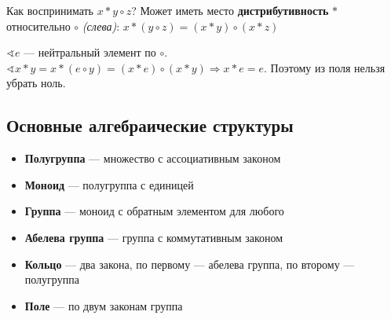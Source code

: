 Как воспринимать \(x * y \circ z\)? Может иметь место \textbf{дистрибутивность} \(*\) относительно \(\circ\) \textit{(слева)}: \(x * (y \circ z) = (x * y) \circ (x * z)\)

\(\sphericalangle e\) --- нейтральный элемент по \(\circ\). \(\sphericalangle x * y = x * (e \circ y) = (x * e) \circ (x * y) \Rightarrow x * e = e\). Поэтому из поля нельзя убрать ноль.

\subsection{Основные алгебраические структуры}

\begin{itemize}
    \item \textbf{Полугруппа} --- множество с ассоциативным законом
    \item \textbf{Моноид} --- полугруппа с единицей
    \item \textbf{Группа} --- моноид с обратным элементом для любого
    \item \textbf{Абелева группа} --- группа с коммутативным законом
    \item \textbf{Кольцо} --- два закона, по первому --- абелева группа, по второму --- полугруппа
    \item \textbf{Поле} --- по двум законам группа
\end{itemize}
